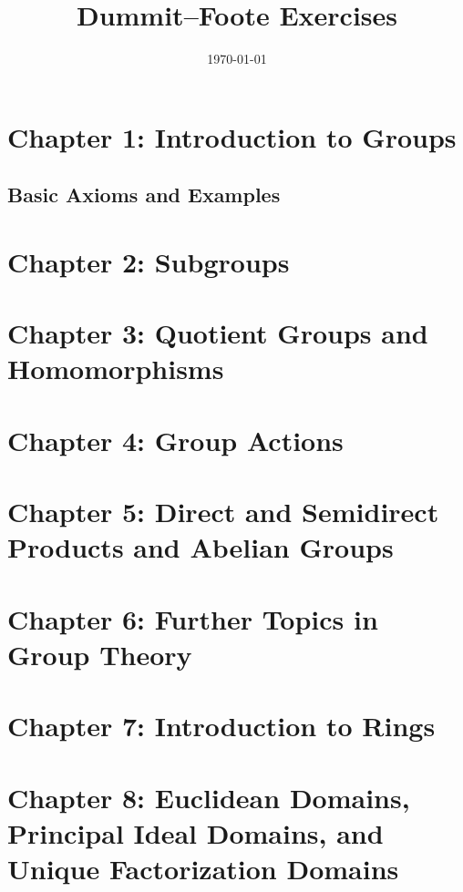 \documentclass[11pt]{article}
\title{Dummit--Foote Exercises}
\date{\today}
\theoremstyle{definition}
\theoremstyle{remark}
\numberwithin{equation}{section}
\numberwithin{thm}{subsection}
\begin{document}
\maketitle

\section{Chapter 1: Introduction to Groups}

\subsection{Basic Axioms and Examples}

\newpage

\section{Chapter 2: Subgroups}

\newpage

\section{Chapter 3: Quotient Groups and Homomorphisms}

\newpage

\section{Chapter 4: Group Actions}

\newpage

\section{Chapter 5: Direct and Semidirect Products and Abelian Groups}

\newpage

\section{Chapter 6: Further Topics in Group Theory}

\newpage

\section{Chapter 7: Introduction to Rings}

\newpage

\section{Chapter 8: Euclidean Domains, Principal Ideal Domains, and Unique Factorization Domains}
\end{document}
